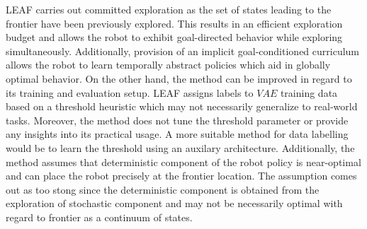 \documentclass[11pt,letterpaper]{article}
\begin{document}
LEAF carries out committed exploration as the set of states leading to the frontier have been previously explored. This results in an efficient exploration budget and allows the robot to exhibit goal-directed behavior while exploring simultaneously. Additionally, provision of an implicit goal-conditioned curriculum allows the robot to learn temporally abstract policies which aid in globally optimal behavior. On the other hand, the method can be improved in regard to its training and evaluation setup. LEAF assigns labels to $VAE$ training data based on a threshold heuristic which may not necessarily generalize to real-world tasks. Moreover, the method does not tune the threshold parameter or provide any insights into its practical usage. A more suitable method for data labelling would be to learn the threshold using an auxilary architecture. Additionally, the method assumes that deterministic component of the robot policy is near-optimal and can place the robot precisely at the frontier location. The assumption comes out as too stong since the deterministic component is obtained from the exploration of stochastic component and may not be necessarily optimal with regard to frontier as a continuum of states. 
\end{document}
